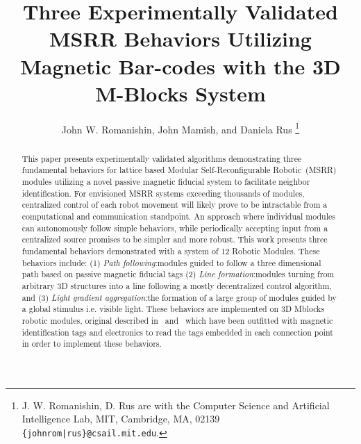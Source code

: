 \documentclass[letterpaper, 10 pt, conference]{ieeeconf}
\title{Three Experimentally Validated MSRR Behaviors Utilizing Magnetic Bar-codes with the 3D M-Blocks System}
\author{John W. Romanishin, John Mamish, and Daniela Rus
  \thanks{J. W. Romanishin, D. Rus are with the Computer Science
    and Artificial Intelligence Lab, MIT, Cambridge, MA, 02139
    {\tt\small \{johnrom|rus\}@csail.mit.edu}.}
}
\begin{document}
	
\newcommand{\tagName}{MFTag }
\newcommand{\TagName}{MFTag }
\newcommand{\tagNamePlural}{MFTags }
\newcommand{\TagNamePlural}{MFTags }


\captionsetup[figure]{labelfont=small, textfont=small}
\captionsetup[table]{labelfont=small, textfont=small}

\maketitle
\thispagestyle{empty}
\pagestyle{empty}

\begin{abstract}

This paper presents experimentally validated algorithms demonstrating three fundamental behaviors for lattice based Modular Self-Reconfigurable Robotic~(MSRR) modules utilizing a novel passive magnetic fiducial system to facilitate neighbor identification. For envisioned MSRR systems exceeding thousands of modules, centralized control of each robot movement will likely prove to be intractable from a computational and communication standpoint. An approach where individual modules can autonomously follow simple behaviors, while periodically accepting input from a centralized source promises to be simpler and more robust. This work presents three fundamental behaviors demonstrated with a system of 12 Robotic Modules. These behaviors include: (1) \textit{Path following}:modules guided to follow a three dimensional path based on passive magnetic fiducial tags (2) \textit{Line formation}:modules turning from arbitrary 3D structures into a line following a mostly decentralized control algorithm, and (3) \textit{Light gradient aggregation}:the formation of a large group of modules guided by a global stimulus i.e. visible light. These behaviors are implemented on 3D Mblocks robotic modules, original described in~\cite{RomanishinRus-IROS13} and~\cite{Romanishin20153d} which have been outfitted with magnetic identification tags and electronics to read the tags embedded in each connection point in order to implement these behaviors. 

\end{abstract}
\end{document}
